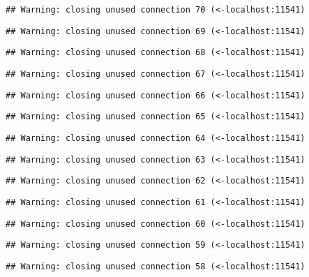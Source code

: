 \documentclass[]{article}
\begin{document}
\begin{verbatim}
## Warning: closing unused connection 70 (<-localhost:11541)
\end{verbatim}

\begin{verbatim}
## Warning: closing unused connection 69 (<-localhost:11541)
\end{verbatim}

\begin{verbatim}
## Warning: closing unused connection 68 (<-localhost:11541)
\end{verbatim}

\begin{verbatim}
## Warning: closing unused connection 67 (<-localhost:11541)
\end{verbatim}

\begin{verbatim}
## Warning: closing unused connection 66 (<-localhost:11541)
\end{verbatim}

\begin{verbatim}
## Warning: closing unused connection 65 (<-localhost:11541)
\end{verbatim}

\begin{verbatim}
## Warning: closing unused connection 64 (<-localhost:11541)
\end{verbatim}

\begin{verbatim}
## Warning: closing unused connection 63 (<-localhost:11541)
\end{verbatim}

\begin{verbatim}
## Warning: closing unused connection 62 (<-localhost:11541)
\end{verbatim}

\begin{verbatim}
## Warning: closing unused connection 61 (<-localhost:11541)
\end{verbatim}

\begin{verbatim}
## Warning: closing unused connection 60 (<-localhost:11541)
\end{verbatim}

\begin{verbatim}
## Warning: closing unused connection 59 (<-localhost:11541)
\end{verbatim}

\begin{verbatim}
## Warning: closing unused connection 58 (<-localhost:11541)
\end{verbatim}
\end{document}
